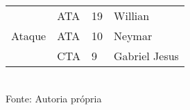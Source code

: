 \documentclass{article}
\newcommand{\source}[1]{\\ Fonte: #1}
\begin{document}
\begin{table}[!h]
\begin{tabular}{|c|l|l|l|}
\multirow{3}{*}{Ataque}                                         & ATA               & 19               & Willian                         \\ \cline{2-4} 
                                                                & ATA               & 10               & Neymar                          \\ \cline{2-4} 
                                                                & CTA               & 9                & Gabriel Jesus                   \\ \hline
\end{tabular}
\source{Autoria própria}
\end{table}
\end{document}
